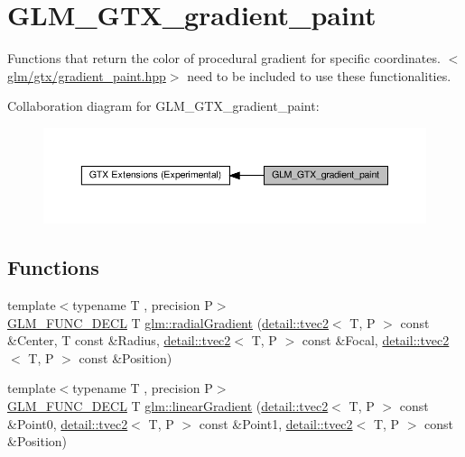 \hypertarget{group__gtx__gradient__paint}{}\section{G\+L\+M\+\_\+\+G\+T\+X\+\_\+gradient\+\_\+paint}
\label{group__gtx__gradient__paint}


Functions that return the color of procedural gradient for specific coordinates. $<$\hyperlink{gradient__paint_8hpp}{glm/gtx/gradient\+\_\+paint.\+hpp}$>$ need to be included to use these functionalities.  


Collaboration diagram for G\+L\+M\+\_\+\+G\+T\+X\+\_\+gradient\+\_\+paint\+:\nopagebreak
\begin{figure}[H]
\begin{center}
\leavevmode
\includegraphics[width=350pt]{group__gtx__gradient__paint}
\end{center}
\end{figure}
\subsection*{Functions}
\begin{DoxyCompactItemize}
\item 
{\footnotesize template$<$typename T , precision P$>$ }\\\hyperlink{setup_8hpp_ab2d052de21a70539923e9bcbf6e83a51}{G\+L\+M\+\_\+\+F\+U\+N\+C\+\_\+\+D\+E\+CL} T \hyperlink{group__gtx__gradient__paint_ga864c46234e363137b717119231f422f6}{glm\+::radial\+Gradient} (\hyperlink{structglm_1_1detail_1_1tvec2}{detail\+::tvec2}$<$ T, P $>$ const \&Center, T const \&Radius, \hyperlink{structglm_1_1detail_1_1tvec2}{detail\+::tvec2}$<$ T, P $>$ const \&Focal, \hyperlink{structglm_1_1detail_1_1tvec2}{detail\+::tvec2}$<$ T, P $>$ const \&Position)
\item 
{\footnotesize template$<$typename T , precision P$>$ }\\\hyperlink{setup_8hpp_ab2d052de21a70539923e9bcbf6e83a51}{G\+L\+M\+\_\+\+F\+U\+N\+C\+\_\+\+D\+E\+CL} T \hyperlink{group__gtx__gradient__paint_ga01eb377864e98f86bd44378e1b86eb22}{glm\+::linear\+Gradient} (\hyperlink{structglm_1_1detail_1_1tvec2}{detail\+::tvec2}$<$ T, P $>$ const \&Point0, \hyperlink{structglm_1_1detail_1_1tvec2}{detail\+::tvec2}$<$ T, P $>$ const \&Point1, \hyperlink{structglm_1_1detail_1_1tvec2}{detail\+::tvec2}$<$ T, P $>$ const \&Position)
\end{DoxyCompactItemize}


